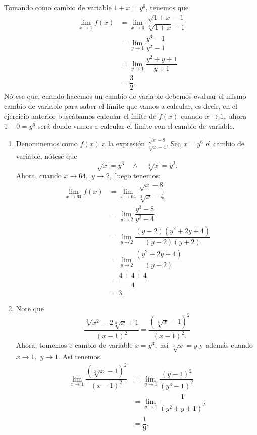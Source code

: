 Tomando como cambio de variable \(1+x=y^6\), tenemos que
\begin{align*}
\lim\limits_{x\to 1}f(x)&=\lim\limits_{x\to 0}\dfrac{\sqrt{1+x}-1}{\sqrt[3]{1+x}-1}\\
&=\lim\limits_{y\to 1}\dfrac{y^3-1}{y^2-1}\\
&=\lim\limits_{y\to 1}\dfrac{y^2+y+1}{y+1}\\
&=\dfrac{3}{2}.
\end{align*}
N\'otese que, cuando hacemos un cambio de variable debemos evaluar el mismo cambio de variable para saber el l\'imite que vamos a calcular, es decir, en el ejercicio anterior busc\'abamos calcular el \'imite de \(f(x)\) cuando \(x\to 1,\) ahora \(1+0=y^6\)  ser\'a donde vamos a calcular el l\'imite con el cambio de variable.\newline

\begin{example}
	\begin{enumerate}
		\item Denominemos como \(f(x)\) a la expresi\'on \(\frac{\sqrt{x}-8}{\sqrt[3]{x}-4}.\) Sea \(x=y^6\) el cambio de variable, n\'otese que
		\[\sqrt{x}=y^3\quad\wedge\quad\sqrt[3]{x}=y^2.\]
		Ahora, cuando \(x\to64,\) \(y\to2,\) luego tenemos:
		\begin{align*}
		\lim\limits_{x\to 64}f(x)&=\lim\limits_{x\to 64}\dfrac{\sqrt{x}-8}{\sqrt[3]{x}-4}\\
		&=\lim\limits_{y\to 2}\dfrac{y^3-8}{y^2-4} \\
		&=\lim\limits_{y\to 2}\dfrac{(y-2)(y^2+2y+4)}{(y-2)(y+2)}\\
		&=\lim\limits_{y\to 2}\dfrac{(y^2+2y+4)}{(y+2)}\\
		&=\dfrac{4+4+4}{4}\\
		&=3.
		\end{align*}
		\item Note que
		\[\dfrac{\sqrt[3]{x^2}-2\sqrt[3]{x}+1}{(x-1)^2}=\dfrac{(\sqrt[3]{x}-1)^2}{(x-1)^2.}\]
		Ahora, tomemos e cambio de variable \(x=y^3,\) as\'i \(\sqrt[3]{x}=y\) y adem\'as cuando \(x\to 1,\) \(y\to 1.\) As\'i tenemos
		\begin{align*}
		\lim\limits_{x\to 1}\dfrac{(\sqrt[3]{x}-1)^2}{(x-1)^2}&=\lim\limits_{y\to 1}\dfrac{(y-1)^2}{(y^3-1)^2}\\
		&=\lim\limits_{y\to 1}\dfrac{1}{(y^2+y+1)^2}\\
		&=\dfrac{1}{9}.
		\end{align*}
		
	\end{enumerate}
\end{example}

